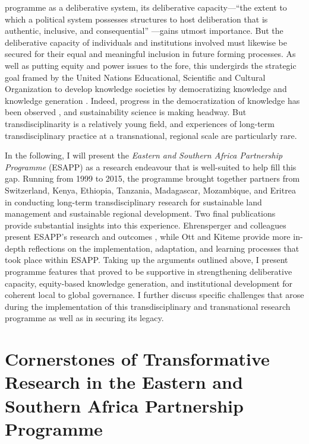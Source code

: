 \documentclass[10pt,a4paper]{article}
\begin{document}
\begin{multicols}{2}
programme as a deliberative system, its deliberative capacity---``the extent to which a political system possesses structures to host deliberation that is authentic, inclusive, and consequential'' \citep{r51}---gains utmost importance. But the deliberative capacity of individuals and institutions involved must likewise be secured for their equal and meaningful inclusion in future forming processes.  As well as putting equity and power issues to the fore, this undergirds the strategic goal framed by the United Nations Educational, Scientific and Cultural Organization to develop knowledge societies by democratizing knowledge and knowledge generation \citep{r56}. Indeed, progress in the democratization of knowledge has been observed \citep{r57}, and sustainability science is making headway. But transdisciplinarity is a relatively young field, and experiences of long-term transdisciplinary practice at a transnational, regional scale are particularly rare.

In the following, I will present the \textit{Eastern and Southern Africa Partnership Programme} (ESAPP) as a research endeavour that is well-suited to help fill this gap. Running from 1999 to 2015, the programme brought together partners from Switzerland, Kenya, Ethiopia, Tanzania, Madagascar, Mozambique, and Eritrea in conducting long-term transdisciplinary research for sustainable land management and sustainable regional development. Two final publications provide substantial insights into this experience. Ehrensperger and colleagues present ESAPP's research and outcomes \citep{r58}, while Ott and Kiteme \citep{r59} provide more in-depth reflections on the implementation, adaptation, and learning processes that took place within ESAPP. Taking up the arguments outlined above, I present programme features that proved to be supportive in strengthening deliberative capacity, equity-based knowledge generation, and institutional development for coherent local to global governance. I further discuss specific challenges that arose during the implementation of this transdisciplinary and transnational research programme as well as in securing its legacy.

\section{Cornerstones of Transformative Research in the Eastern and Southern Africa Partnership Programme}

	

\end{multicols}
\end{document}
